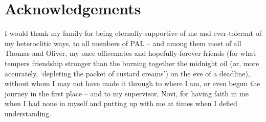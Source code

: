 
\begingroup
\let\clearpage\relax
\let\cleardoublepage\relax
\let\cleardoublepage\relax
\chapter*{Acknowledgements}
%
I would thank my family for being eternally-supportive of me and ever-tolerant of my heteroclitic
ways, to all members of PAL -- and among them most of all Thomas and Oliver, my once officemates
and hopefully-forever friends (for what tempers friendship stronger than the burning together the
midnight oil (or, more accurately, `depleting the packet of custard creams') on the eve of a
deadline), without whom I may not have made it through to where I am, or even begun the journey in
the first place -- and to my supervisor, Novi, for having faith in me when I had none in myself and
putting up with me at times when I defied understanding.
%
\endgroup
